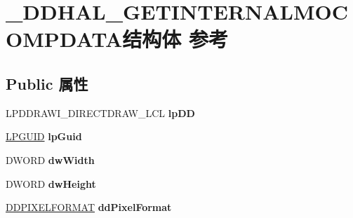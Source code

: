 \hypertarget{struct___d_d_h_a_l___g_e_t_i_n_t_e_r_n_a_l_m_o_c_o_m_p_d_a_t_a}{}\section{\+\_\+\+D\+D\+H\+A\+L\+\_\+\+G\+E\+T\+I\+N\+T\+E\+R\+N\+A\+L\+M\+O\+C\+O\+M\+P\+D\+A\+T\+A结构体 参考}
\label{struct___d_d_h_a_l___g_e_t_i_n_t_e_r_n_a_l_m_o_c_o_m_p_d_a_t_a}
\subsection*{Public 属性}
\begin{DoxyCompactItemize}
\item 
\mbox{\label{struct___d_d_h_a_l___g_e_t_i_n_t_e_r_n_a_l_m_o_c_o_m_p_d_a_t_a_aac1b30e25155d2c23f1192ea06e3e11f}} 
L\+P\+D\+D\+R\+A\+W\+I\+\_\+\+D\+I\+R\+E\+C\+T\+D\+R\+A\+W\+\_\+\+L\+CL {\bfseries lp\+DD}
\item 
\mbox{\label{struct___d_d_h_a_l___g_e_t_i_n_t_e_r_n_a_l_m_o_c_o_m_p_d_a_t_a_a1b75a630aff150e18ec8c2ef82ddcdf1}} 
\hyperlink{interface_g_u_i_d}{L\+P\+G\+U\+ID} {\bfseries lp\+Guid}
\item 
\mbox{\label{struct___d_d_h_a_l___g_e_t_i_n_t_e_r_n_a_l_m_o_c_o_m_p_d_a_t_a_a2e8cb7f212e2283e26bec12f949abf3b}} 
D\+W\+O\+RD {\bfseries dw\+Width}
\item 
\mbox{\label{struct___d_d_h_a_l___g_e_t_i_n_t_e_r_n_a_l_m_o_c_o_m_p_d_a_t_a_a602efa1823d08ee5438e248daae76834}} 
D\+W\+O\+RD {\bfseries dw\+Height}
\item 
\mbox{\label{struct___d_d_h_a_l___g_e_t_i_n_t_e_r_n_a_l_m_o_c_o_m_p_d_a_t_a_a0cb8b8e4dbc230c6100dda714784cdc8}} 
\hyperlink{struct___d_d_p_i_x_e_l_f_o_r_m_a_t}{D\+D\+P\+I\+X\+E\+L\+F\+O\+R\+M\+AT} {\bfseries dd\+Pixel\+Format}
\item 
\mbox{\label{struct___d_d_h_a_l___g_e_t_i_n_t_e_r_n_a_l_m_o_c_o_m_p_d_a_t_a_a16f5f7e95f349faad601a13bf5d704f9}} 

\end{DoxyCompactItemize}
